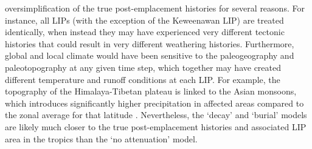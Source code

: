 oversimplification of the true post-emplacement histories for several reasons. For instance, all LIPs (with the exception of the Keweenawan LIP) are treated identically, when instead they may have experienced very different tectonic histories that could result in very different weathering histories. Furthermore, global and local climate would have been sensitive to the paleogeography and paleotopography at any given time step, which together may have created different temperature and runoff conditions at each LIP. For example, the topography of the Himalaya-Tibetan plateau is linked to the Asian monsoons, which introduces significantly higher precipitation in affected areas compared to the zonal average for that latitude \citep{Zhisheng2001a}. Nevertheless, the `decay' and `burial' models are likely much closer to the true post-emplacement histories and associated LIP area in the tropics than the `no attenuation' model.

